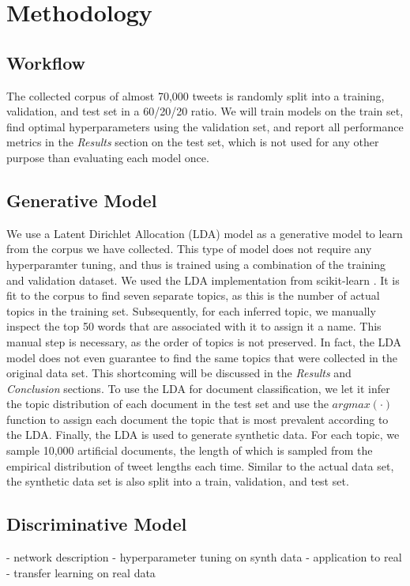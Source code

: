 \documentclass[11pt]{article}
\begin{document}
\section{Methodology}
\subsection{Workflow}
The collected corpus of almost 70,000 tweets is randomly split into a training, validation, and test set in a 60/20/20 ratio. We will train models on the train set, find optimal hyperparameters using the validation set, and report all performance metrics in the \emph{Results} section on the test set, which is not used for any other purpose than evaluating each model once.


\subsection{Generative Model}
We use a Latent Dirichlet Allocation (LDA) model as a generative model to learn from the corpus we have collected. This type of model does not require any hyperparamter tuning, and thus is trained using a combination of the training and validation dataset. We used the LDA implementation from scikit-learn \cite{sklearn}. It is fit to the corpus to find seven separate topics, as this is the number of actual topics in the training set. Subsequently, for each inferred topic, we manually inspect the top 50 words that are associated with it to assign it a name. This manual step is necessary, as the order of topics is not preserved. In fact, the LDA model does not even guarantee to find the same topics that were collected in the original data set. This shortcoming will be discussed in the \emph{Results} and \emph{Conclusion} sections. 
To use the LDA for document classification,  we let it infer the topic distribution of each document in the test set and use the $argmax(\cdot)$ function to assign each document the topic that is most prevalent according to the LDA.
Finally, the LDA is used to generate synthetic data. For each topic, we sample 10,000 artificial documents, the length of which is sampled from the empirical distribution of tweet lengths each time. Similar to the actual data set, the synthetic data set is also split into a train, validation, and test set.


\subsection{Discriminative Model}
- network description
- hyperparameter tuning on synth data
- application to real
- transfer learning on real data
\end{document}
